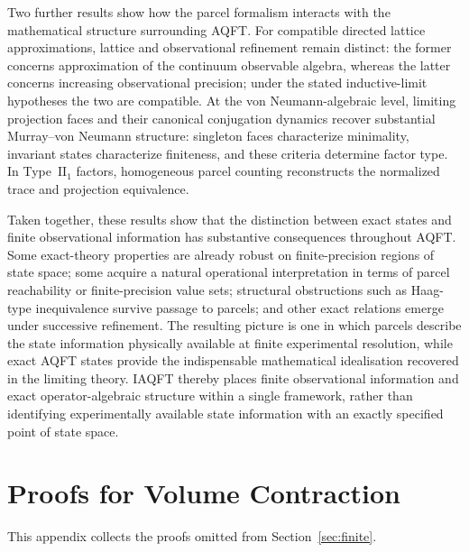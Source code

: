 \documentclass[11pt]{article}
\begin{document}
Two further results show how the parcel formalism interacts with the
mathematical structure surrounding AQFT. For compatible directed lattice
approximations, lattice and observational refinement remain distinct:
the former concerns approximation of the continuum observable algebra,
whereas the latter concerns increasing observational precision; under the
stated inductive-limit hypotheses the two are compatible. At the
von Neumann-algebraic level, limiting projection faces and their canonical
conjugation dynamics recover substantial Murray--von Neumann structure:
singleton faces characterize minimality, invariant states characterize
finiteness, and these criteria determine factor type. In
Type~$\mathrm{II}_1$ factors, homogeneous parcel counting reconstructs
the normalized trace and projection equivalence.

Taken together, these results show that the distinction between exact
states and finite observational information has substantive consequences
throughout AQFT. Some exact-theory properties are already robust on
finite-precision regions of state space; some acquire a natural
operational interpretation in terms of parcel reachability or
finite-precision value sets; structural obstructions such as Haag-type
inequivalence survive passage to parcels; and other exact relations
emerge under successive refinement. The resulting picture is one in
which parcels describe the state information physically available at
finite experimental resolution, while exact AQFT states provide the
indispensable mathematical idealisation recovered in the limiting
theory. IAQFT thereby places finite observational information and exact
operator-algebraic structure within a single framework, rather than
identifying experimentally available state information with an exactly
specified point of state space.
\appendix

\section{Proofs for Volume Contraction}\label{sec:proofs-vo}
This appendix collects the proofs omitted from Section~\ref{sec:finite}.
\end{document}
